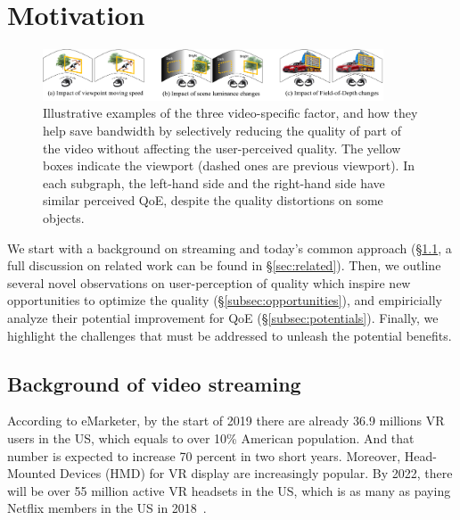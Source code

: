 
\section{Motivation}
\label{sec:motivate}

\begin{figure}[t!]
  \centering
  \includegraphics[width=0.9\textwidth]{figures/examples.pdf}
  \caption{Illustrative examples of the three \vr video-specific factor, and how they help save bandwidth by selectively reducing the quality of part of the video without affecting the user-perceived quality. The yellow boxes indicate the viewport (dashed ones are previous viewport). 
In each subgraph, the left-hand side and the right-hand side have similar perceived QoE, despite the quality distortions on some objects.}
  \label{fig:examples}
  \end{figure}

We start with a background on \vrvideo streaming and today's common approach (\S\ref{subsec:background}, a full discussion on related work can be found in \S\ref{sec:related}).
Then, we outline several novel observations on user-perception of \vrvideo quality which inspire new opportunities to optimize the \vrvideo quality (\S\ref{subsec:opportunities}), and empiricially analyze their potential improvement for QoE (\S\ref{subsec:potentials}).
Finally, we highlight the challenges that must be addressed to unleash the potential benefits.


\subsection{Background of \vr video streaming}
\label{subsec:background}

According to eMarketer, by the start of 2019 there are already 36.9 millions VR users in the US, which equals to over 10\% American population. And that number is expected to increase 70 percent in two short years. \cite{https://channelfactory.com/blog/youtube-trends-vr-ar-advertising/} Moreover, Head-Mounted Devices (HMD) for VR display are increasingly popular. By 2022, there will be over 55 million active VR headsets in the US, which is as many as paying Netflix members in the US in 2018~\cite{https://qz.com/1298512/vr-could-be-as-big-in-the-us-as-netflix-in-five-years-study-shows/}.

